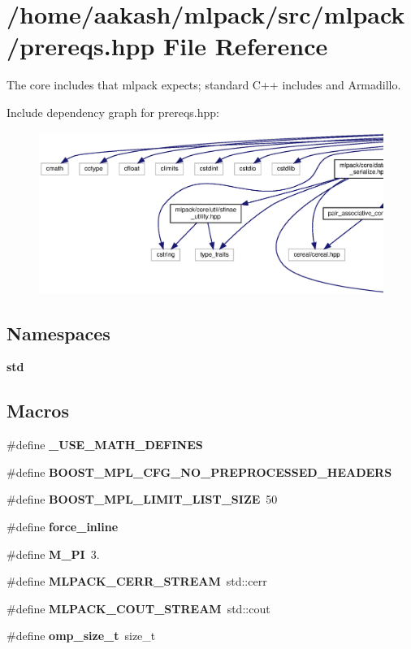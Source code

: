 \section{/home/aakash/mlpack/src/mlpack/prereqs.hpp File Reference}
\label{prereqs_8hpp}


The core includes that mlpack expects; standard C++ includes and Armadillo.  


Include dependency graph for prereqs.\+hpp\+:
\nopagebreak
\begin{figure}[H]
\begin{center}
\leavevmode
\includegraphics[width=350pt]{prereqs_8hpp__incl}
\end{center}
\end{figure}
\subsection*{Namespaces}
\begin{DoxyCompactItemize}
\item 
 \textbf{ std}
\end{DoxyCompactItemize}
\subsection*{Macros}
\begin{DoxyCompactItemize}
\item 
\#define \textbf{ \+\_\+\+U\+S\+E\+\_\+\+M\+A\+T\+H\+\_\+\+D\+E\+F\+I\+N\+ES}
\item 
\#define \textbf{ B\+O\+O\+S\+T\+\_\+\+M\+P\+L\+\_\+\+C\+F\+G\+\_\+\+N\+O\+\_\+\+P\+R\+E\+P\+R\+O\+C\+E\+S\+S\+E\+D\+\_\+\+H\+E\+A\+D\+E\+RS}
\item 
\#define \textbf{ B\+O\+O\+S\+T\+\_\+\+M\+P\+L\+\_\+\+L\+I\+M\+I\+T\+\_\+\+L\+I\+S\+T\+\_\+\+S\+I\+ZE}~50
\item 
\#define \textbf{ force\+\_\+inline}
\item 
\#define \textbf{ M\+\_\+\+PI}~3.
\item 
\#define \textbf{ M\+L\+P\+A\+C\+K\+\_\+\+C\+E\+R\+R\+\_\+\+S\+T\+R\+E\+AM}~std\+::cerr
\item 
\#define \textbf{ M\+L\+P\+A\+C\+K\+\_\+\+C\+O\+U\+T\+\_\+\+S\+T\+R\+E\+AM}~std\+::cout
\item 
\#define \textbf{ omp\+\_\+size\+\_\+t}~size\+\_\+t
\end{DoxyCompactItemize}

